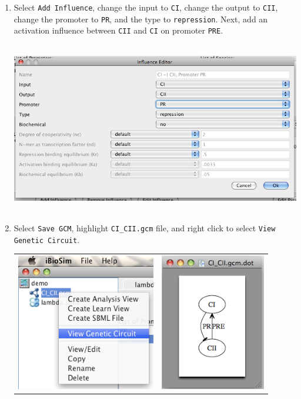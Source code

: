 \documentclass[titlepage,11pt]{article}
\begin{document}
\begin{enumerate}
\clearpage

\item Select {\tt Add Influence}, change the input to {\tt CI}, change
  the output to {\tt CII}, change the promoter to {\tt PR}, and the
  type to {\tt repression}.  Next, add an activation influence between
  {\tt CII} and {\tt CI} on promoter {\tt PRE}.

\includegraphics[height=75mm]{screenshots/influence}

\item Select {\tt Save GCM}, highlight {\tt CI\_CII.gcm} file, and
  right click to select {\tt View Genetic Circuit}.

\begin{tabular}{cc}
\includegraphics[height=60mm]{screenshots/viewGenNet}&
\includegraphics[height=60mm]{screenshots/viewGCM}
\end{tabular}
\end{enumerate}
\end{document}
